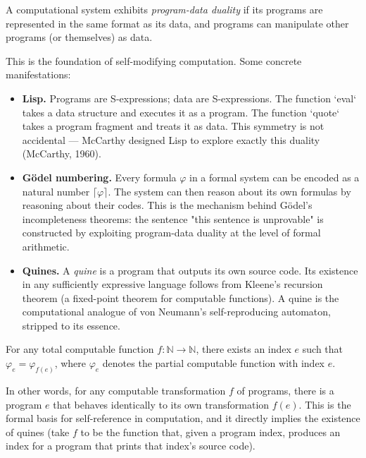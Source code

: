 \begin{definition}
A computational system exhibits \textit{program-data duality} if its programs are represented in the same format as its data, and programs can manipulate other programs (or themselves) as data.

This is the foundation of self-modifying computation. Some concrete manifestations:

\begin{itemize}
\item \textbf{Lisp.} Programs are S-expressions; data are S-expressions. The function `eval` takes a data structure and executes it as a program. The function `quote` takes a program fragment and treats it as data. This symmetry is not accidental --- McCarthy designed Lisp to explore exactly this duality (McCarthy, 1960).

\item \textbf{Gödel numbering.} Every formula $\varphi$ in a formal system can be encoded as a natural number $\lceil \varphi \rceil$. The system can then reason about its own formulas by reasoning about their codes. This is the mechanism behind Gödel's incompleteness theorems: the sentence "this sentence is unprovable" is constructed by exploiting program-data duality at the level of formal arithmetic.

\item \textbf{Quines.} A \textit{quine} is a program that outputs its own source code. Its existence in any sufficiently expressive language follows from Kleene's recursion theorem (a fixed-point theorem for computable functions). A quine is the computational analogue of von Neumann's self-reproducing automaton, stripped to its essence.
\end{itemize}
\end{definition}

\begin{theorem}
For any total computable function $f: \mathbb{N} \to \mathbb{N}$, there exists an index $e$ such that $\varphi_e = \varphi_{f(e)}$, where $\varphi_e$ denotes the partial computable function with index $e$.

In other words, for any computable transformation $f$ of programs, there is a program $e$ that behaves identically to its own transformation $f(e)$. This is the formal basis for self-reference in computation, and it directly implies the existence of quines (take $f$ to be the function that, given a program index, produces an index for a program that prints that index's source code).
\end{theorem}

